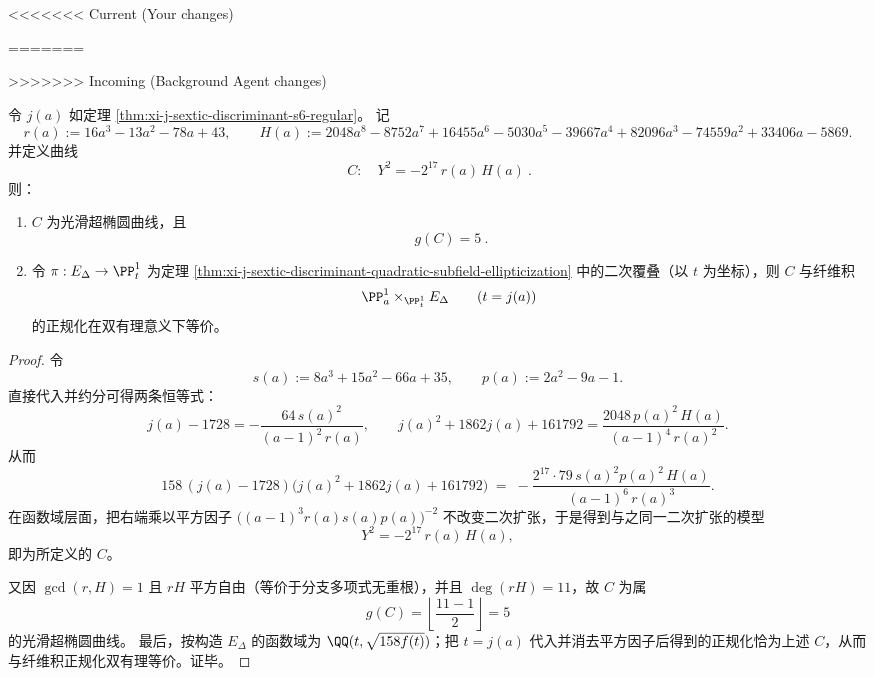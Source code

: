 <<<<<<< Current (Your changes)

=======

>>>>>>> Incoming (Background Agent changes)

\begin{theorem}\label{thm:xi-j-sextic-fiber-product-genus5-hyperelliptic-model}
令 \(j(a)\) 如定理 \ref{thm:xi-j-sextic-discriminant-s6-regular}。
记
\[
r(a):=16a^3-13a^2-78a+43,
\qquad
H(a):=2048a^8-8752a^7+16455a^6-5030a^5-39667a^4+82096a^3-74559a^2+33406a-5869.
\]
并定义曲线
\[
\boxed{\ C:\quad Y^2=-2^{17}\,r(a)\,H(a)\ }.
\]
则：
\begin{enumerate}
  \item \(C\) 为光滑超椭圆曲线，且
  \[
  \boxed{\ g(C)=5\ }.
  \]
  \item 令 \(\pi:E_\Delta\to\PP^1_t\) 为定理 \ref{thm:xi-j-sextic-discriminant-quadratic-subfield-ellipticization} 中的二次覆叠（以 \(t\) 为坐标），则 \(C\) 与纤维积
  \[
  \PP^1_a\times_{\PP^1_t}E_\Delta
  \qquad(t=j(a))
  \]
  的正规化在双有理意义下等价。
\end{enumerate}
\end{theorem}
\begin{proof}
令
\[
s(a):=8a^3+15a^2-66a+35,\qquad p(a):=2a^2-9a-1.
\]
直接代入并约分可得两条恒等式：
\[
j(a)-1728=-\frac{64\,s(a)^2}{(a-1)^2\,r(a)},
\qquad
j(a)^2+1862j(a)+161792=\frac{2048\,p(a)^2\,H(a)}{(a-1)^4\,r(a)^2}.
\]
从而
\[
158\,(j(a)-1728)\bigl(j(a)^2+1862j(a)+161792\bigr)
\;=\;
-\frac{2^{17}\cdot 79\, s(a)^2p(a)^2\,H(a)}{(a-1)^6\,r(a)^3}.
\]
在函数域层面，把右端乘以平方因子 \(\bigl((a-1)^3r(a)s(a)p(a)\bigr)^{-2}\) 不改变二次扩张，于是得到与之同一二次扩张的模型
\[
Y^2=-2^{17}\,r(a)\,H(a),
\]
即为所定义的 \(C\)。
\par
又因 \(\gcd(r,H)=1\) 且 \(rH\) 平方自由（等价于分支多项式无重根），并且 \(\deg(rH)=11\)，故 \(C\) 为属
\[
g(C)=\left\lfloor\frac{11-1}{2}\right\rfloor=5
\]
的光滑超椭圆曲线。
最后，按构造 \(E_\Delta\) 的函数域为 \(\QQ(t,\sqrt{158f(t)})\)；把 \(t=j(a)\) 代入并消去平方因子后得到的正规化恰为上述 \(C\)，从而与纤维积正规化双有理等价。证毕。
\end{proof}

